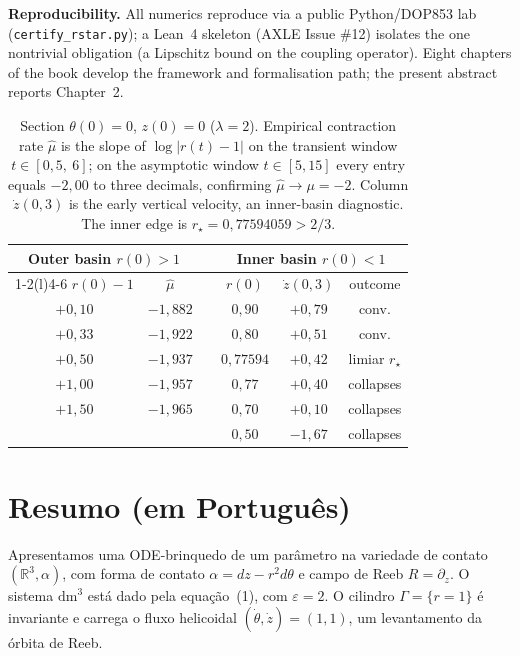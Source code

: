 \documentclass[11pt,a4paper]{article}
\theoremstyle{plain}
\newcommand{\rstar}{r_{\star}}
\begin{document}
\medskip
\noindent\textbf{Reproducibility.} All numerics reproduce via a public Python/DOP853 lab
(\texttt{certify\_rstar.py}); a Lean~4 skeleton (AXLE Issue \#12) isolates the one nontrivial
obligation (a Lipschitz bound on the coupling operator). Eight chapters of the book develop the
framework and formalisation path; the present abstract reports Chapter~2.

\begin{table}[h]
\centering\small
\setlength{\tabcolsep}{7pt}
\renewcommand{\arraystretch}{1.12}
\begin{tabular}{@{}cc c@{\hskip 20pt} ccc@{}}
\toprule
\multicolumn{2}{c}{\textbf{Outer basin} $r(0)>1$} & &
\multicolumn{3}{c}{\textbf{Inner basin} $r(0)<1$}\\
\cmidrule(r){1-2}\cmidrule(l){4-6}
$r(0)-1$ & $\hat\mu$ & & $r(0)$ & $\dot z(0{,}3)$ & outcome \\
\midrule
$+0{,}10$ & $-1{,}882$ & & $0{,}90$      & $+0{,}79$ & conv.\\
$+0{,}33$ & $-1{,}922$ & & $0{,}80$      & $+0{,}51$ & conv.\\
$+0{,}50$ & $-1{,}937$ & & \cellcolor{hilite}$0{,}77594$ & \cellcolor{hilite}$+0{,}42$ & \cellcolor{hilite}limiar $\rstar$\\
$+1{,}00$ & $-1{,}957$ & & $0{,}77$      & $+0{,}40$ & collapses\\
$+1{,}50$ & $-1{,}965$ & & $0{,}70$      & $+0{,}10$ & collapses\\
          &            & & $0{,}50$      & $-1{,}67$ & collapses\\
\bottomrule
\end{tabular}
\caption{Section $\theta(0)=0$, $z(0)=0$ ($\lambda = 2$). Empirical contraction rate $\hat\mu$ is the
slope of $\log|r(t)-1|$ on the transient window $t \in [0{,}5,\ 6]$; on the asymptotic window
$t \in [5,15]$ every entry equals $-2{,}00$ to three decimals, confirming
$\hat\mu \to \mu = -2$. Column $\dot z(0{,}3)$ is the early vertical velocity, an inner-basin
diagnostic. The inner edge is $\rstar = 0{,}77594059 > 2/3$.}
\end{table}

\section*{Resumo (em Português)}
Apresentamos uma ODE-brinquedo de um parâmetro na variedade de contato $(\mathbb{R}^3,\alpha)$, com
forma de contato $\alpha = dz - r^2 d\theta$ e campo de Reeb $R = \partial_z$. O sistema
$\mathrm{dm}^3$ está dado pela equação~(1), com $\varepsilon = 2$. O cilindro $\Gamma = \{r=1\}$ é
invariante e carrega o fluxo helicoidal $(\dot\theta,\dot z) = (1,1)$, um levantamento da órbita de
Reeb.
\end{document}
